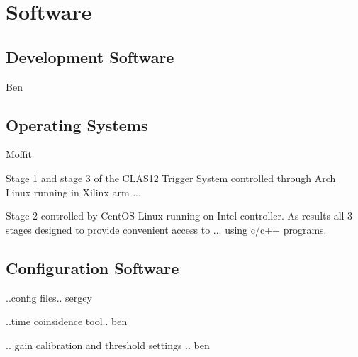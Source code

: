 \section{Software}



\subsection{Development Software} Ben

\subsection{Operating Systems} Moffit

Stage 1 and stage 3 of the CLAS12 Trigger System controlled through Arch Linux running in Xilinx arm ...

Stage 2 controlled by CentOS Linux running on Intel controller. As results all 3 stages designed to provide convenient access to ...
using c/c++ programs.



\subsection{Configuration Software}

..config files.. sergey

..time coinsidence tool.. ben

.. gain calibration and threshold settings .. ben
